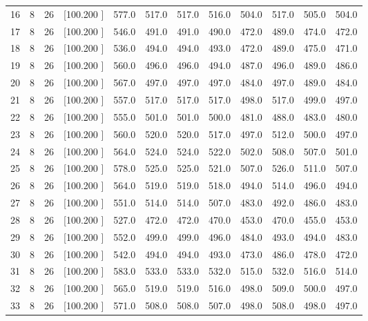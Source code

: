 \documentclass[12pt,a4paper]{article}
\begin{document}
\begin{center}
{\begin{tabular}{r r r r r r r r r r r r}
  16&  8& 26&[100.200   ]&   577.0&   517.0&   517.0&   516.0&   504.0&   517.0&   505.0&   504.0\\[-0.02in]
  17&  8& 26&[100.200   ]&   546.0&   491.0&   491.0&   490.0&   472.0&   489.0&   474.0&   472.0\\[-0.02in]
  18&  8& 26&[100.200   ]&   536.0&   494.0&   494.0&   493.0&   472.0&   489.0&   475.0&   471.0\\[-0.02in]
  19&  8& 26&[100.200   ]&   560.0&   496.0&   496.0&   494.0&   487.0&   496.0&   489.0&   486.0\\[-0.02in]
  20&  8& 26&[100.200   ]&   567.0&   497.0&   497.0&   497.0&   484.0&   497.0&   489.0&   484.0\\[-0.02in]
  21&  8& 26&[100.200   ]&   557.0&   517.0&   517.0&   517.0&   498.0&   517.0&   499.0&   497.0\\[-0.02in]
  22&  8& 26&[100.200   ]&   555.0&   501.0&   501.0&   500.0&   481.0&   488.0&   483.0&   480.0\\[-0.02in]
  23&  8& 26&[100.200   ]&   560.0&   520.0&   520.0&   517.0&   497.0&   512.0&   500.0&   497.0\\[-0.02in]
  24&  8& 26&[100.200   ]&   564.0&   524.0&   524.0&   522.0&   502.0&   508.0&   507.0&   501.0\\[-0.02in]
  25&  8& 26&[100.200   ]&   578.0&   525.0&   525.0&   521.0&   507.0&   526.0&   511.0&   507.0\\[-0.02in]
  26&  8& 26&[100.200   ]&   564.0&   519.0&   519.0&   518.0&   494.0&   514.0&   496.0&   494.0\\[-0.02in]
  27&  8& 26&[100.200   ]&   551.0&   514.0&   514.0&   507.0&   483.0&   492.0&   486.0&   483.0\\[-0.02in]
  28&  8& 26&[100.200   ]&   527.0&   472.0&   472.0&   470.0&   453.0&   470.0&   455.0&   453.0\\[-0.02in]
  29&  8& 26&[100.200   ]&   552.0&   499.0&   499.0&   496.0&   484.0&   493.0&   494.0&   483.0\\[-0.02in]
  30&  8& 26&[100.200   ]&   542.0&   494.0&   494.0&   493.0&   473.0&   486.0&   478.0&   472.0\\[-0.02in]
  31&  8& 26&[100.200   ]&   583.0&   533.0&   533.0&   532.0&   515.0&   532.0&   516.0&   514.0\\[-0.02in]
  32&  8& 26&[100.200   ]&   565.0&   519.0&   519.0&   516.0&   498.0&   509.0&   500.0&   497.0\\[-0.02in]
  33&  8& 26&[100.200   ]&   571.0&   508.0&   508.0&   507.0&   498.0&   508.0&   498.0&   497.0\\[-0.02in]

\end{tabular}}
\end{center}
\end{document}
